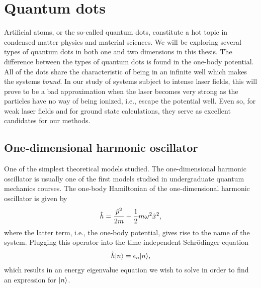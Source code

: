 \section{Quantum dots}
    Artificial atoms, or the so-called quantum dots, constitute a hot topic in
    condensed matter physics and material sciences. We will be exploring
    several types of quantum dots in both one and two dimensions in this
    thesis. The difference between the types of quantum dots is found in the
    one-body potential. All of the dots share the characteristic of being in an
    infinite well which makes the systems \emph{bound}. In our study of systems
    subject to intense laser fields, this will prove to be a bad approximation
    when the laser becomes very strong as the particles have no way of being
    ionized, i.e., escape the potential well.  Even so, for weak laser fields
    and for ground state calculations, they serve as excellent candidates for
    our methods.

    \subsection{One-dimensional harmonic oscillator}
        One of the simplest theoretical models studied. The one-dimensional
        harmonic oscillator is usually one of the first models studied in
        undergraduate quantum mechanics courses. The one-body Hamiltonian of the
        one-dimensional harmonic oscillator is given by
        \begin{align}
            \hat{h} = \frac{\hat{p}^2}{2m} + \frac{1}{2} m\omega^2 \hat{x}^2,
            \label{eq:1dho-hamiltonian}
        \end{align}
        where the latter term, i.e., the one-body potential, gives rise to the
        name of the system. Plugging this operator into the time-independent
        Schrödinger equation
        \begin{gather}
            \hat{h}| n \rangle = \epsilon_n| n \rangle,
        \end{gather}
        which results in an energy eigenvalue equation we wish to solve in order
        to find an expression for $| n \rangle$.

